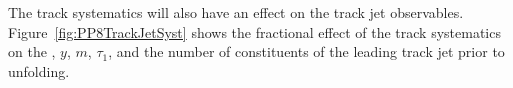 The track systematics will also have an effect on the track jet observables. Figure~\ref{fig:PP8TrackJetSyst} shows the fractional effect of the track systematics on the \pt, $y$, $m$, $\tau_1$, and the number of constituents of the leading track jet prior to unfolding.

\begin{figure}[h!]
  \centering
   \\
   \\

\end{figure}
